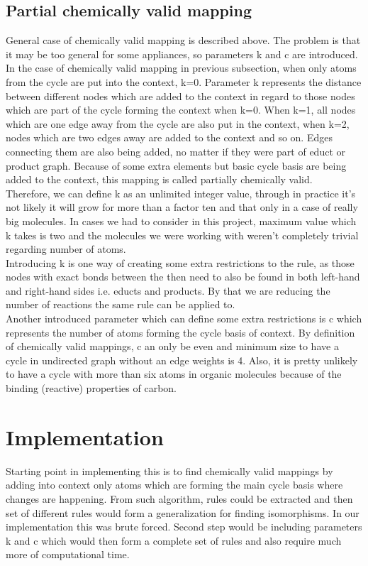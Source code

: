 \documentclass[a4paper,10pt,titlepage]{report}
\begin{document}
\subsection{Partial chemically valid mapping}

General case of chemically valid mapping is described above. The problem is that it may be too general for some appliances, so parameters k and c are introduced.
In the case of chemically valid mapping in previous subsection, when only atoms from the cycle are put into the context, k=0. Parameter k represents the distance between different nodes which are added to the context in regard to those nodes which are part of the cycle forming the context when k=0. When k=1, all nodes which are one edge away from the cycle are also put in the context, when k=2, nodes which are two edges away are added to the context and so on. Edges connecting them are also being added, no matter if they were part of educt or product graph. Because of some extra elements but basic cycle basis are being added to the context, this mapping is called partially chemically valid.
\\
Therefore, we can define k as an unlimited integer value, through in practice it's not likely it will grow for more than a factor ten and that only in a case of really big molecules. In cases we had to consider in this project, maximum value which k takes is two and the molecules we were working with weren't completely trivial regarding number of atoms. 
\\
Introducing k is one way of creating some extra restrictions to the rule, as those nodes with exact bonds between the then need to also be found in both left-hand and right-hand sides i.e. educts and products. By that we are reducing the number of reactions the same rule can be applied to. 
\\
Another introduced parameter which can define some extra restrictions is c which represents the number of atoms forming the cycle basis of context. By definition of chemically valid mappings, c an only be even and minimum size to have a cycle in undirected graph without an edge weights is 4. Also, it is pretty unlikely to have a cycle with more than six atoms in organic molecules because of the binding (reactive) properties of carbon. 

\section {Implementation}

Starting point in implementing this is to find chemically valid mappings by adding into context only atoms which are forming the main cycle basis where changes are happening. From such algorithm, rules could be extracted and then set of different rules would form a generalization for finding isomorphisms. In our implementation this was brute forced. Second step would be including parameters k and c which would then form a complete set of rules and also require much more of computational time. 
\end{document}
